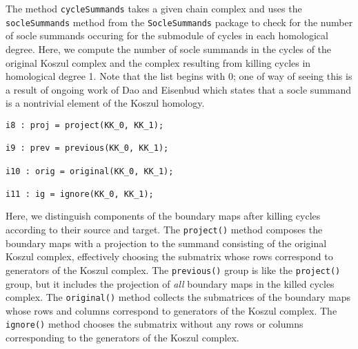 \documentclass[twoside,12pt, leqno]{amsart}
\begin{document}
The method \texttt{cycleSummands} takes a given chain complex and uses the \texttt{socleSummands} method from the \texttt{SocleSummands} package to check for the number of socle summands occuring for the submodule of cycles in each homological degree. Here, we compute the number of socle summands in the cycles of the original Koszul complex and the complex resulting from killing cycles in homological degree 1. Note that the list begins with 0; one of way of seeing this is a result of ongoing work of Dao and Eisenbud which states that a socle summand is a nontrivial element of the Koszul homology.

\begin{footnotesize}
\begin{verbatim}
i8 : proj = project(KK_0, KK_1);

i9 : prev = previous(KK_0, KK_1);

i10 : orig = original(KK_0, KK_1);

i11 : ig = ignore(KK_0, KK_1);
\end{verbatim}
\end{footnotesize}

Here, we distinguish components of the boundary maps after killing cycles according to their source and target. The \texttt{project()} method composes the boundary maps with a projection to the summand consisting of the original Koszul complex, effectively choosing the submatrix whose rows correspond to generators of the Koszul complex. The \texttt{previous()} group is like the \texttt{project()} group, but it includes the projection of \textit{all} boundary maps in the killed cycles complex. The \texttt{original()} method collects the submatrices of the boundary maps whose rows and columns correspond to generators of the Koszul complex. The \texttt{ignore()} method chooses the submatrix without any rows or columns corresponding to the generators of the Koszul complex.
\end{document}
